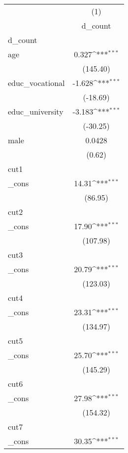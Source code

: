 {
\def\sym#1{\ifmmode^{#1}\else\(^{#1}\)\fi}
\begin{tabular}{l*{1}{c}}
\hline\hline
            &\multicolumn{1}{c}{(1)}\\
            &\multicolumn{1}{c}{d\_count}\\
\hline
d\_count     &                     \\
age         &       0.327\sym{***}\\
            &    (145.40)         \\
[1em]
educ\_vocational&      -1.628\sym{***}\\
            &    (-18.69)         \\
[1em]
educ\_university&      -3.183\sym{***}\\
            &    (-30.25)         \\
[1em]
male        &      0.0428         \\
            &      (0.62)         \\
\hline
cut1        &                     \\
\_cons      &       14.31\sym{***}\\
            &     (86.95)         \\
\hline
cut2        &                     \\
\_cons      &       17.90\sym{***}\\
            &    (107.98)         \\
\hline
cut3        &                     \\
\_cons      &       20.79\sym{***}\\
            &    (123.03)         \\
\hline
cut4        &                     \\
\_cons      &       23.31\sym{***}\\
            &    (134.97)         \\
\hline
cut5        &                     \\
\_cons      &       25.70\sym{***}\\
            &    (145.29)         \\
\hline
cut6        &                     \\
\_cons      &       27.98\sym{***}\\
            &    (154.32)         \\
\hline
cut7        &                     \\
\_cons      &       30.35\sym{***}\\

\end{tabular}}
